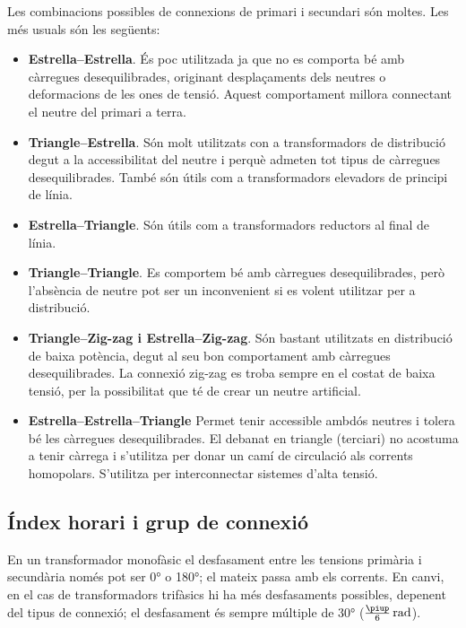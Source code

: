 Les combinacions possibles de connexions de primari i secundari són moltes. Les més usuals són les següents:
\begin{itemize}
   \item \textbf{Estrella--Estrella}. És poc utilitzada ja que no es comporta bé amb càrregues desequilibrades, originant desplaçaments dels neutres o deformacions de les ones de tensió. Aquest comportament millora connectant el neutre del primari a terra.
   \item \textbf{Triangle--Estrella}. Són molt utilitzats con a transformadors de distribució degut a la accessibilitat del neutre i perquè admeten tot tipus de càrregues desequilibrades. També són útils com a transformadors elevadors de principi de línia.
   \item \textbf{Estrella--Triangle}. Són útils com a transformadors reductors al final de línia.
   \item \textbf{Triangle--Triangle}. Es comportem bé amb càrregues desequilibrades, però l'absència de neutre pot ser un inconvenient si es volent utilitzar per a distribució.
   \item \textbf{Triangle--Zig-zag i Estrella--Zig-zag}. Són bastant utilitzats en distribució de baixa potència, degut al seu bon comportament amb càrregues desequilibrades. La connexió zig-zag es troba sempre en el costat de baixa tensió, per la possibilitat que té de crear un neutre artificial.
   \item \textbf{Estrella--Estrella--Triangle} Permet tenir accessible ambdós  neutres i tolera  bé les càrregues  desequilibrades. El debanat en triangle (terciari) no acostuma a tenir càrrega i s'utilitza per donar un camí de circulació als corrents homopolars. S'utilitza per interconnectar sistemes d'alta tensió.
\end{itemize}


\subsection{Índex horari i grup de connexió}\label{sec:connex-index-horari}

En un transformador monofàsic el desfasament entre les tensions primària i secundària només pot ser \ang{0} o \ang{180}; el mateix passa amb els corrents. En canvi, en el cas de transformadors trifàsics hi ha més desfasaments possibles, depenent del tipus de connexió; el desfasament és sempre múltiple de \ang{30} ($\frac{\piup}{6}\si{\,rad}$).

